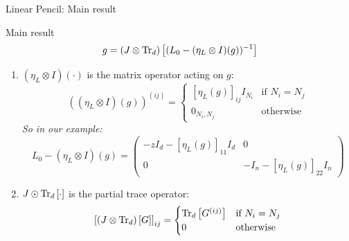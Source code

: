 \documentclass[10pt]{beamer}
\begin{document}
\begin{frame}{Linear Pencil: Main result}
  \begin{block}{Main result \cite{spectra,mingo2017free}}
    \begin{equation}\label{eq:main-result-linear-pencil}
        g = \traceLimOp[d]{
            (L_0 - (\eta_L \otimes I)(g))^{-1}
        }
    \end{equation}
  \end{block}
\begin{enumerate}
  \item $(\eta_L \otimes I)(\cdot)$ is the matrix operator acting on $g$:
  \begin{equation*}
    ((\eta_L \otimes I)(g))^{(ij)} = 
    \begin{cases}
      [\eta_L(g)]_{ij} I_{N_i} & \text{if } N_i=N_j\\
      0_{N_i,N_j} & \text{otherwise}
    \end{cases}
  \end{equation*}
  \emph{So in our example:}
  \begin{equation*}
    L_0 - (\eta_L \otimes I)(g) =
    \begin{pmatrix}
      -zI_d - [\eta_L(g)]_{11} I_d & 0\\
      0 & -I_n -  [\eta_L(g)]_{22} I_n
    \end{pmatrix}
  \end{equation*}

  \item   $J \odot \traceLim[d]{\cdot}$ is the partial trace operator:
  \begin{equation*}
    \left[\traceLimOp[d]{G}\right]_{ij} = 
    \begin{cases}
      \traceLim[d]{G^{(ij)}} & \text{if } N_i=N_j\\
      0 & \text{otherwise}
    \end{cases}
  \end{equation*}
  \end{enumerate}
    
\end{frame}
\end{document}
